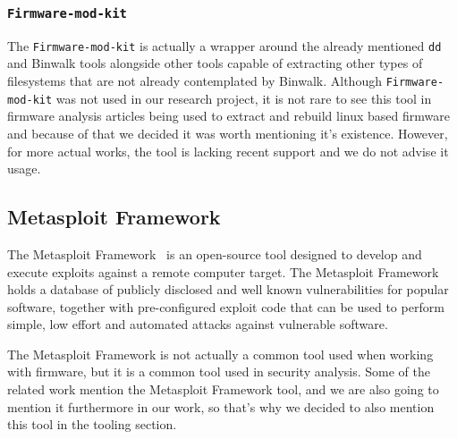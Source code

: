 \subsubsection{ {\tt Firmware-mod-kit} }

The {\tt Firmware-mod-kit} \cite{google-code:firmware-mod-kit} is actually a wrapper around the already mentioned {\tt dd} and Binwalk tools alongside other tools capable of extracting other types of filesystems that are not already contemplated by Binwalk. Although {\tt Firmware-mod-kit} was not used in our research project, it is not rare to see this tool in firmware analysis articles being used to extract and rebuild linux based firmware and because of that we decided it was worth mentioning it's existence. However, for more actual works, the tool is lacking recent support and we do not advise it usage.

\subsection{ Metasploit Framework }

The Metasploit Framework~\cite{github:metasploit} is an open-source tool designed to develop and execute exploits against a remote computer target. The Metasploit Framework holds a database of publicly disclosed and well known vulnerabilities for popular software, together with pre-configured exploit code that can be used to perform simple, low effort and automated attacks against vulnerable software.

The Metasploit Framework is not actually a common tool used when working with firmware, but it is a common tool used in security analysis. Some of the related work mention the Metasploit Framework tool, and we are also going to mention it furthermore in our work, so that's why we decided to also mention this tool in the tooling section.